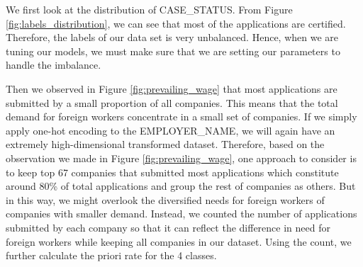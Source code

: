 \documentclass{article}
\begin{document}
We first look at the distribution of CASE\_STATUS. From Figure \ref{fig:labels_distribution}, we can see that most of the applications are certified. Therefore, the labels of our data set is very unbalanced. Hence, when we are tuning our models, we must make sure that we are setting our parameters to handle the imbalance. 

Then we observed in Figure \ref{fig:prevailing_wage} that most applications are submitted by a small proportion of all companies. This means that the total demand for foreign workers concentrate in a small set of companies. If we simply apply one-hot encoding to the EMPLOYER\_NAME, we will again have an extremely high-dimensional transformed dataset. Therefore, based on the observation we made in Figure \ref{fig:prevailing_wage}, one approach to consider is to keep top 67 companies that submitted most applications which constitute around 80\% of total applications and group the rest of companies as others. But in this way, we might overlook the diversified needs for foreign workers of companies with smaller demand. Instead, we counted the number of applications submitted by each company so that it can reflect the difference in need for foreign workers while keeping all companies in our dataset. Using the count, we further calculate the priori rate for the 4 classes. 
\end{document}
